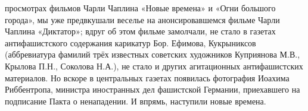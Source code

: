 \label{22-1}
просмотрах фильмов Чарли Чаплина «Новые времена» и «Огни большого города», мы уже предвкушали веселье на анонсировавшемся фильме Чарли Чаплина «Диктатор»; вдруг об этом фильме замолчали, не стало в газетах антифашистского содержания карикатур Бор. Ефимова, Кукрыниксов (аббревиатура фамилий трёх известных советских художников Куприянова М.В., Крылова П.Н., Соколова Н.А.), не стало и других агитационных антифашистских материалов. Но вскоре в центральных газетах появилась фотография Иоахима Риббентропа, министра иностранных дел фашистской Германии, приехавшего на подписание Пакта о ненападении. И впрямь, наступили новые времена.